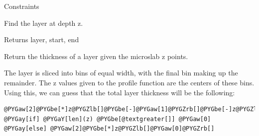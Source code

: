 \documentclass[letterpaper,10pt,english]{sphinxmanual}
\begin{document}
\begin{fulllineitems}
\begin{fulllineitems}
\label{api/polymer:refl1d.polymer.VolumeProfile.constraints}
Constraints

\end{fulllineitems}


\begin{fulllineitems}
\label{api/polymer:refl1d.polymer.VolumeProfile.find}
Find the layer at depth z.

Returns layer, start, end

\end{fulllineitems}


\begin{fulllineitems}
\label{api/polymer:refl1d.polymer.VolumeProfile.parameters}
\end{fulllineitems}


\begin{fulllineitems}
\label{api/polymer:refl1d.polymer.VolumeProfile.render}
\end{fulllineitems}


\end{fulllineitems}


\begin{fulllineitems}
\label{api/polymer:refl1d.polymer.layer_thickness}
Return the thickness of a layer given the microslab z points.

The layer is sliced into bins of equal width, with the final
bin making up the remainder.  The z values given to the profile
function are the centers of these bins.  Using this, we can
guess that the total layer thickness will be the following:

\begin{Verbatim}[commandchars=@\[\]]
@PYGaw[2]@PYGbe[*]z@PYGZlb[]@PYGbe[-]@PYGaw[1]@PYGZrb[]@PYGbe[-]z@PYGZlb[]@PYGbe[-]@PYGaw[2]@PYGZrb[] @PYGay[if] @PYGaY[len](z) @PYGbe[@textgreater[]] @PYGaw[0] @PYGay[else] @PYGaw[2]@PYGbe[*]z@PYGZlb[]@PYGaw[0]@PYGZrb[]
\end{Verbatim}

\end{fulllineitems}
\end{document}
